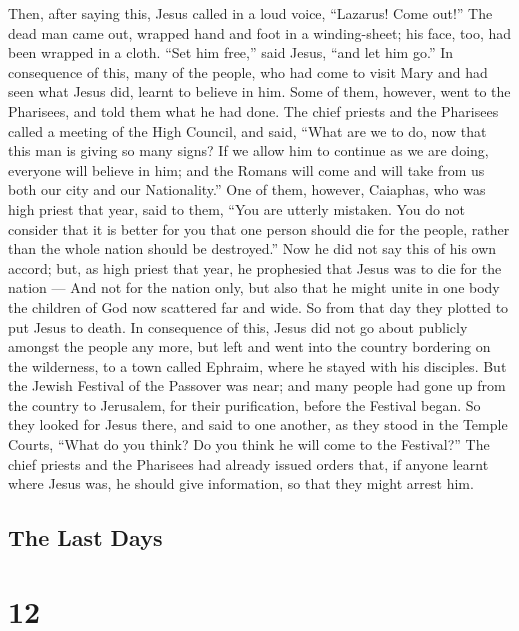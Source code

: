 Then, after saying this, Jesus called in a loud voice,
``Lazarus! Come out!''  The dead man came out, wrapped hand
and foot in a winding-sheet; his face, too, had been wrapped in a cloth.
``Set him free,'' said Jesus, ``and let him go.''  In
consequence of this, many of the people, who had come to visit Mary and
had seen what Jesus did, learnt to believe in him.  Some of
them, however, went to the Pharisees, and told them what he had done.
 The chief priests and the Pharisees called a meeting of
the High Council, and said, ``What are we to do, now that this man is
giving so many signs?  If we allow him to continue as we
are doing, everyone will believe in him; and the Romans will come and
will take from us both our city and our Nationality.''  One
of them, however, Caiaphas, who was high priest that year, said to them,
 ``You are utterly mistaken. You do not consider that it is
better for you that one person should die for the people, rather than
the whole nation should be destroyed.''  Now he did not say
this of his own accord; but, as high priest that year, he prophesied
that Jesus was to die for the nation ---  And not for the
nation only, but also that he might unite in one body the children of
God now scattered far and wide.  So from that day they
plotted to put Jesus to death.  In consequence of this,
Jesus did not go about publicly amongst the people any more, but left
and went into the country bordering on the wilderness, to a town called
Ephraim, where he stayed with his disciples.  But the
Jewish Festival of the Passover was near; and many people had gone up
from the country to Jerusalem, for their purification, before the
Festival began.  So they looked for Jesus there, and said
to one another, as they stood in the Temple Courts, ``What do you think?
Do you think he will come to the Festival?''  The chief
priests and the Pharisees had already issued orders that, if anyone
learnt where Jesus was, he should give information, so that they might
arrest him.

\hypertarget{the-last-days}{%
\subsection{The Last Days}\label{the-last-days}}

\hypertarget{section-11}{%
\section{12}\label{section-11}}

